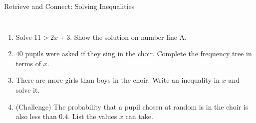 \documentclass{beamer}
\newcommand{\ashow}[1]{\uncover<2->{\textcolor{red}{\small #1}}}
\newcommand{\tightlist}{%
  \setlength{\itemsep}{0pt}\setlength{\parskip}{0pt}\setlength{\topsep}{0pt}%
}
\begin{document}
\begin{frame}[t]{Retrieve and Connect: Solving Inequalities}
\begin{columns}[T,onlytextwidth]
\vspace{-1.5em}
\footnotesize
\begin{enumerate}\tightlist
{}
  \item Solve $11>2x+3$. Show the solution on number line A.
        \ashow{$8>2x$, so $4>x$, which is $x<4$}
  \item $40$ pupils were asked if they sing in the choir. Complete the frequency tree in
        terms of $x$.
  \item There are more girls than boys in the choir. Write an inequality in $x$ and
        solve it.
        \ashow{$x-6>6$, so $x>12$}
  \item (Challenge) The probability that a pupil chosen at random is in the choir is also
        less than $0.4$. List the values $x$ can take.
        \ashow{$0.4\times40=16$, so $12<x<16$: \; $x=13$, $14$ or $15$}
\end{enumerate}
\end{columns}
\end{frame}
\end{document}
